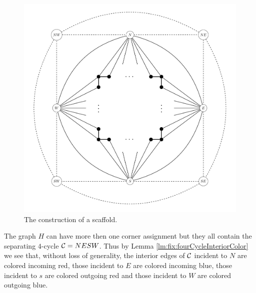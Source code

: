   \begin{figure}[h!]
  \centering
  \includegraphics[scale=0.5]{fixExtension/img/scafold}

  \caption{The construction of a scaffold.
      \label{fig:scafold}}
  \end{figure}


  The graph $H$ can have more then one corner assignment but they all contain the separating $4$-cycle $\mathcal{C}= NESW$. Thus by Lemma \ref{lm:fix:fourCycleInteriorColor} we see that, without loss of generality, the interior edges of $\mathcal{C}$ incident to $N$ are colored incoming red, those incident to $E$ are colored incoming blue, those incident to $s$ are colored outgoing red and those incident to $W$ are colored outgoing blue.


